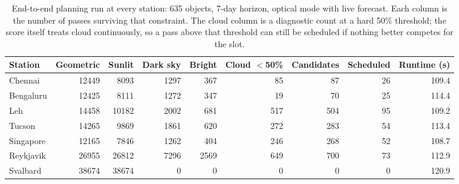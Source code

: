 \begin{table}[t]
\caption{End-to-end planning run at every station: 635 objects, 7-day horizon, optical mode with live forecast. Each column is the number of passes surviving that constraint. The cloud column is a diagnostic count at a hard 50\% threshold; the score itself treats cloud continuously, so a pass above that threshold can still be scheduled if nothing better competes for the slot.}
\label{tab:pipeline}
\centering
\begin{tabular}{lrrrrrrrr}
\toprule
Station & Geometric & Sunlit & Dark sky & Bright & Cloud $<$50\% & Candidates & Scheduled & Runtime (s) \\
\midrule
Chennai & 12449 & 8093 & 1297 & 367 & 85 & 87 & 26 & 109.4 \\
Bengaluru & 12425 & 8111 & 1272 & 347 & 19 & 70 & 25 & 114.4 \\
Leh & 14458 & 10182 & 2002 & 681 & 517 & 504 & 95 & 109.2 \\
Tucson & 14265 & 9869 & 1861 & 620 & 272 & 283 & 54 & 113.4 \\
Singapore & 12165 & 7846 & 1262 & 404 & 246 & 268 & 52 & 108.7 \\
Reykjavik & 26955 & 26812 & 7296 & 2569 & 649 & 700 & 73 & 112.9 \\
Svalbard & 38674 & 38674 & 0 & 0 & 0 & 0 & 0 & 120.9 \\
\bottomrule
\end{tabular}
\end{table}
